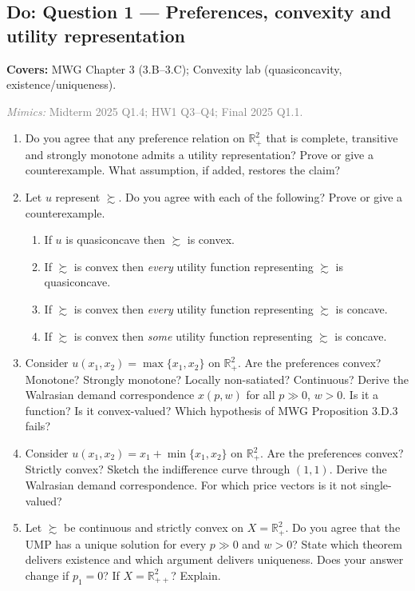 \documentclass[11pt]{article}
\newcommand{\R}{\mathbb{R}}
\newcommand{\pref}{\succsim}
\newcommand{\covers}[1]{\par\noindent\textcolor{blue!60!black}{\small\textbf{Covers:} #1}\medskip}
\newcommand{\mimic}[1]{\par\noindent\textcolor{gray}{\small\textit{Mimics:} #1}\medskip}
\begin{document}
\subsection{Do: Question 1 --- Preferences, convexity and utility representation}
\covers{MWG Chapter 3 (3.B--3.C); Convexity lab (quasiconcavity, existence/uniqueness).}
\mimic{Midterm 2025 Q1.4; HW1 Q3--Q4; Final 2025 Q1.1.}

\begin{enumerate}[label=\textbf{1.\arabic*}]
  \item Do you agree that any preference relation on $\R^2_+$ that is complete, transitive and strongly monotone admits a utility representation? Prove or give a counterexample. What assumption, if added, restores the claim?
  \item Let $u$ represent $\pref$. Do you agree with each of the following? Prove or give a counterexample.
  \begin{enumerate}[label=(\alph*)]
    \item If $u$ is quasiconcave then $\pref$ is convex.
    \item If $\pref$ is convex then \emph{every} utility function representing $\pref$ is quasiconcave.
    \item If $\pref$ is convex then \emph{every} utility function representing $\pref$ is concave.
    \item If $\pref$ is convex then \emph{some} utility function representing $\pref$ is concave.
  \end{enumerate}
  \item Consider $u(x_1,x_2)=\max\{x_1,x_2\}$ on $\R^2_+$. Are the preferences convex? Monotone? Strongly monotone? Locally non-satiated? Continuous? Derive the Walrasian demand correspondence $x(p,w)$ for all $p\gg0$, $w>0$. Is it a function? Is it convex-valued? Which hypothesis of MWG Proposition 3.D.3 fails?
  \item Consider $u(x_1,x_2)=x_1+\min\{x_1,x_2\}$ on $\R^2_+$. Are the preferences convex? Strictly convex? Sketch the indifference curve through $(1,1)$. Derive the Walrasian demand correspondence. For which price vectors is it not single-valued?
  \item Let $\pref$ be continuous and strictly convex on $X=\R^2_+$. Do you agree that the UMP has a unique solution for every $p\gg0$ and $w>0$? State which theorem delivers existence and which argument delivers uniqueness. Does your answer change if $p_1=0$? If $X=\R^2_{++}$? Explain.
\end{enumerate}
\end{document}
